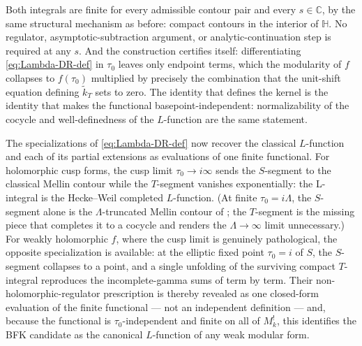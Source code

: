 \documentclass[11pt]{article}
\numberwithin{equation}{section}  %
\newcommand{\HH}{\mathbb{H}}
\newcommand{\CC}{\mathbb{C}}
\begin{document}
Both integrals are finite for every admissible contour pair and every
$s \in \CC$, by the same structural mechanism as before: compact contours
in the interior of $\HH$.  No regulator, asymptotic-subtraction argument,
or analytic-continuation step is required at any $s$.  And the
construction certifies itself: differentiating \eqref{eq:Lambda-DR-def}
in $\tau_0$ leaves only endpoint terms, which the modularity of $f$
collapses to $f(\tau_0)$ multiplied by precisely the combination that the
unit-shift equation defining $\widetilde{k}_T$ sets to zero.  The
identity that defines the kernel is the identity that makes the
functional basepoint-independent: normalizability of the cocycle and
well-definedness of the $L$-function are the same statement.

The specializations of \eqref{eq:Lambda-DR-def} now recover the classical
$L$-function and each of its partial extensions as evaluations of one
finite functional.  For holomorphic cusp forms, the cusp limit
$\tau_0 \to i\infty$ sends the $S$-segment to the classical Mellin
contour while the $T$-segment vanishes exponentially: the L-integral is
the Hecke--Weil completed $L$-function.  (At finite $\tau_0 = i\Lambda$,
the $S$-segment alone is the $\Lambda$-truncated Mellin contour of
\cite{1806}; the $T$-segment is the missing piece that completes it to a
cocycle and renders the $\Lambda \to \infty$ limit unnecessary.)  For
weakly holomorphic $f$, where the cusp limit is genuinely pathological,
the opposite specialization is available: at the elliptic fixed point
$\tau_0 = i$ of $S$, the $S$-segment collapses to a point, and a single
unfolding of the surviving compact $T$-integral reproduces the
incomplete-gamma sums of \cite{BFK2011} term by term.  Their
non-holomorphic-regulator prescription is thereby revealed as one
closed-form evaluation of the finite functional --- not an independent
definition --- and, because the functional is $\tau_0$-independent and
finite on all of $M^!_k$, this identifies the BFK candidate as the
canonical $L$-function of any weak modular form.
\end{document}
